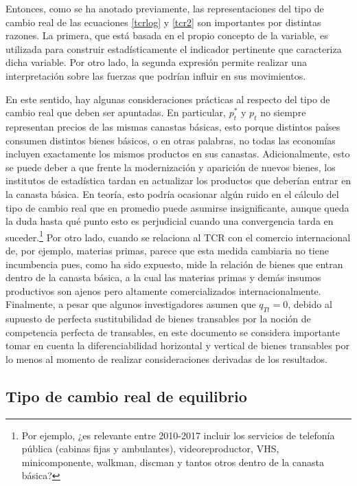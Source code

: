 \documentclass[12pt,letterpaper]{article}
\begin{document}
Entonces, como se ha anotado previamente, las representaciones del tipo de cambio real de las ecuaciones \ref{tcrlog} y \ref{tcr2} son importantes por distintas razones. La primera, que está basada en el propio concepto de la variable, es utilizada para construir estadísticamente el indicador pertinente que caracteriza dicha variable. Por otro lado, la segunda expresión permite realizar una interpretación sobre las fuerzas que podrían influir en sus movimientos.

En este sentido, hay algunas consideraciones prácticas al respecto del tipo de cambio real que deben ser apuntadas. En particular, $p_t^*$ y $p_t$ no siempre representan precios de las mismas canastas básicas, esto porque distintos países consumen distintos bienes básicos, o en otras palabras, no todas las economías incluyen exactamente los mismos productos en sus canastas. Adicionalmente, esto se puede deber a que frente la modernización y aparición de nuevos bienes, los institutos de estadística tardan en actualizar los productos que deberían entrar en la canasta básica. En teoría, esto podría ocasionar algún ruido en el cálculo del tipo de cambio real que en promedio puede asumirse insignificante, aunque queda la duda hasta qué punto esto es perjudicial cuando una convergencia tarda en suceder.\footnote{Por ejemplo, ¿es relevante entre 2010-2017 incluir los servicios de telefonía pública (cabinas fijas y ambulantes), videoreproductor, VHS, minicomponente, walkman, discman y tantos otros dentro de la canasta básica?} Por otro lado, cuando se relaciona al TCR con el comercio internacional de, por ejemplo, materias primas, parece que esta medida cambiaria no tiene incumbencia pues, como ha sido expuesto, mide la relación de bienes que entran dentro de la canasta básica, a la cual las materias primas y demás insumos productivos son ajenos pero altamente comercializados internacionalmente. Finalmente, a pesar que algunos investigadores asumen que $q_{Tt}=0$, debido al supuesto de perfecta sustitubilidad de bienes transables por la noción de competencia perfecta de transables, en este documento se considera importante tomar en cuenta la diferenciabilidad horizontal y vertical de bienes transables por lo menos al momento de realizar consideraciones derivadas de los resultados.

\subsection*{Tipo de cambio real de equilibrio}
\end{document}
